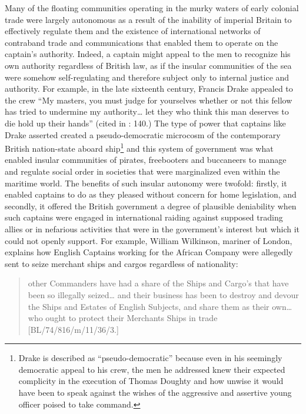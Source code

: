 Many of the floating communities operating in the murky waters of early colonial trade were largely autonomous as a result of the inability of imperial Britain to effectively regulate them and the existence of international networks of contraband trade and communications that enabled them to operate on the captain’s authority. Indeed, a captain might appeal to the men to recognize his own authority regardless of British law, as if the insular communities of the sea were somehow self-regulating and therefore subject only to internal justice and authority. For example, in the late sixteenth century, Francis Drake appealed to the crew “My masters, you must judge for yourselves whether or not this fellow has tried to undermine my authority… let they who think this man deserves to die hold up their hands” (cited in \citealt{Bicheno2012}: 140.) The type of power that captains like Drake asserted created a pseudo-democratic microcosm of the contemporary British nation-state aboard ship\footnote{Drake is described as “pseudo-democratic” because even in his seemingly democratic appeal to his crew, the men he addressed knew their expected complicity in the execution of Thomas Doughty and how unwise it would have been to speak against the wishes of the aggressive and assertive young officer poised to take command.}  and this system of government was what enabled insular communities of pirates, freebooters and buccaneers to manage and regulate social order in societies that were marginalized even within the maritime world. The benefits of such insular autonomy were twofold: firstly, it enabled captains to do as they pleased without concern for home legislation, and secondly, it offered the British government a degree of plausible deniability when such captains were engaged in international raiding against supposed trading allies or in nefarious activities that were in the government’s interest but which it could not openly support. For example, William Wilkinson, mariner of London, explains how English Captains working for the African Company were allegedly sent to seize merchant ships and cargos regardless of nationality: 

\begin{quotation}
other Commanders have had a share of the Ships and Cargo’s that have been so illegally seized… and their business has been to destroy and devour the Ships and Estates of English Subjects, and share them as their own… who ought to protect their Merchants Ships in trade [BL/74/816/m/11/36/3.] \end{quotation}

